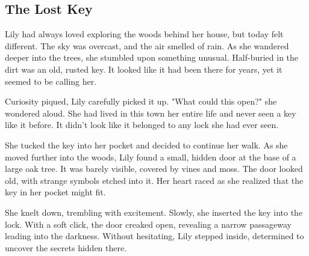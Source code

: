 \documentclass[12pt]{article}
\begin{document}
\onehalfspacing

\subsection*{The Lost Key}
\begin{tcolorbox}[colframe=black!40, colback=gray!5]
\begin{spacing}{1.15}
    Lily had always loved exploring the woods behind her house, but today felt different. The sky was overcast, and the air smelled of rain. As she wandered deeper into the trees, she stumbled upon something unusual. Half-buried in the dirt was an old, rusted key. It looked like it had been there for years, yet it seemed to be calling her.

    Curiosity piqued, Lily carefully picked it up. "What could this open?" she wondered aloud. She had lived in this town her entire life and never seen a key like it before. It didn’t look like it belonged to any lock she had ever seen.

    She tucked the key into her pocket and decided to continue her walk. As she moved further into the woods, Lily found a small, hidden door at the base of a large oak tree. It was barely visible, covered by vines and moss. The door looked old, with strange symbols etched into it. Her heart raced as she realized that the key in her pocket might fit.

    She knelt down, trembling with excitement. Slowly, she inserted the key into the lock. With a soft click, the door creaked open, revealing a narrow passageway leading into the darkness. Without hesitating, Lily stepped inside, determined to uncover the secrets hidden there.
\end{spacing}
\end{tcolorbox}

\end{document}

